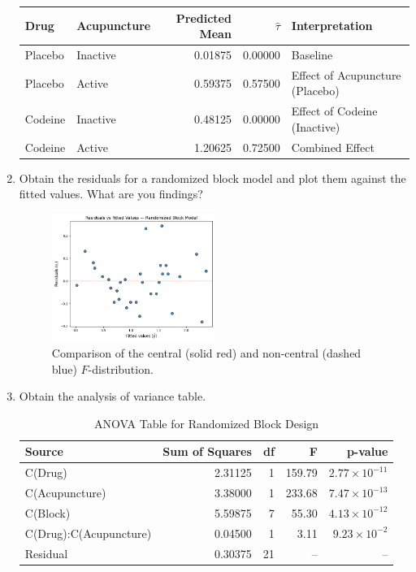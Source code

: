 \documentclass{article}
\begin{document}
\begin{enumerate}
	      \begin{tabular}{llrrl}
		      \toprule
		      Drug    & Acupuncture & Predicted Mean & $\hat{\tau}$ & Interpretation                  \\
		      \midrule
		      Placebo & Inactive    & 0.01875        & 0.00000      & Baseline                        \\
		      Placebo & Active      & 0.59375        & 0.57500      & Effect of Acupuncture (Placebo) \\
		      Codeine & Inactive    & 0.48125        & 0.00000      & Effect of Codeine (Inactive)    \\
		      Codeine & Active      & 1.20625        & 0.72500      & Combined Effect                 \\
		      \bottomrule
	      \end{tabular}

	\item Obtain the residuals for a randomized block model and plot them against the fitted values.
	      What are you findings?
	      \begin{figure}[H]
		      \centering
		      \includegraphics[width=0.5\textwidth]{assets/residuals.png}
		      \caption{Comparison of the central (solid red) and non-central (dashed blue) $F$-distribution.}
	      \end{figure}
	\item Obtain the analysis of variance table.
	      \begin{table}[!ht]
		      \centering
		      \caption{ANOVA Table for Randomized Block Design}
		      \begin{tabular}{lrrrr}
			      \toprule
			      \textbf{Source}        & \textbf{Sum of Squares} & \textbf{df} & \textbf{F} & \textbf{p-value}     \\
			      \midrule
			      C(Drug)                & 2.31125                 & 1           & 159.79     & $2.77\times10^{-11}$ \\
			      C(Acupuncture)         & 3.38000                 & 1           & 233.68     & $7.47\times10^{-13}$ \\
			      C(Block)               & 5.59875                 & 7           & 55.30      & $4.13\times10^{-12}$ \\
			      C(Drug):C(Acupuncture) & 0.04500                 & 1           & 3.11       & $9.23\times10^{-2}$  \\
			      Residual               & 0.30375                 & 21          & --         & --                   \\
			      \bottomrule
		      \end{tabular}
	      \end{table}


\end{enumerate}
\end{document}
